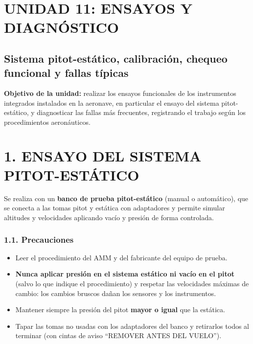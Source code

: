 \clearpage
\section*{UNIDAD 11: ENSAYOS Y DIAGNÓSTICO}
\subsection*{Sistema pitot-estático, calibración, chequeo funcional y fallas típicas}

\begin{recuadro}
\textbf{Objetivo de la unidad:} realizar los ensayos funcionales de los instrumentos integrados
instalados en la aeronave, en particular el ensayo del sistema pitot-estático, y diagnosticar las
fallas más frecuentes, registrando el trabajo según los procedimientos aeronáuticos.
\end{recuadro}

\section*{1. ENSAYO DEL SISTEMA PITOT-ESTÁTICO}

Se realiza con un \textbf{banco de prueba pitot-estático} (manual o automático), que se conecta a
las tomas pitot y estática con adaptadores y permite simular altitudes y velocidades aplicando
vacío y presión de forma controlada.

\subsubsection*{1.1. Precauciones}
\begin{itemize}
  \item Leer el procedimiento del AMM y del fabricante del equipo de prueba.
  \item \textbf{Nunca aplicar presión en el sistema estático ni vacío en el pitot} (salvo lo que
        indique el procedimiento) y respetar las velocidades máximas de cambio: los cambios bruscos
        dañan los sensores y los instrumentos.
  \item Mantener siempre la presión del pitot \textbf{mayor o igual} que la estática.
  \item Tapar las tomas no usadas con los adaptadores del banco y retirarlos todos al terminar (con
        cintas de aviso ``REMOVER ANTES DEL VUELO'').
\end{itemize}

